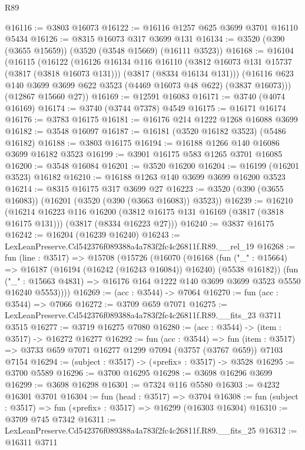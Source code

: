\begin{lexlean}{R89}
\begin{coremodule}
@16116 := @3803 @16073
@16122 := @16116 @1257 @625 @3699 @3701 @16110 @5434
@16126 := @8315 @16073 @317 @3699 @131
@16134 := @3520 (@390 (@3655 @15659)) (@3520 (@3548 @15669) (@16111 @3523))
@16168 := @16104
    (@16115
      (@16122
        (@16126
          @16134
          @116
          @16110
          (@3812 @16073 @131 @15737 (@3817 (@3818 @16073 @131)))
          (@3817 (@8334 @16134 @131)))
        (@16116 @623 @140 @3699 @3699 @622 @3523 (@4469 @16073 @48 @622) (@3837 @16073)))
      (@12867 @15660 @27))
@16169 := @12591 @16083
@16171 := @3740 (@4074 @16169)
@16174 := @3740 (@3744 @7378) @4549
@16175 := @16171 @16174
@16176 := @3783 @16175
@16181 := @16176 @214 @1222 @1268 @16088 @3699
@16182 := @3548 @16097
@16187 := @16181 (@3520 @16182 @3523) (@5486 @16182)
@16188 := @3803 @16175
@16194 := @16188 @1266 @140 @16086 @3699 @16182 @3523
@16199 := @3901 @16175 @583 @1265 @3701 @16085
@16200 := @3548 @16084
@16201 := @3520 @16200
@16204 := @16199 (@16201 @3523) @16182
@16210 := @16188 @1263 @140 @3699 @3699 @16200 @3523
@16214 := @8315 @16175 @317 @3699 @27
@16223 := @3520 (@390 (@3655 @16083)) (@16201 (@3520 (@390 (@3663 @16083)) @3523))
@16239 := @16210
    (@16214
      @16223
      @116
      @16200
      (@3812 @16175 @131 @16169 (@3817 (@3818 @16175 @131)))
      (@3817 (@8334 @16223 @27)))
@16240 := @3837 @16175
@16242 := @16204 (@16239 @16240)
@16243 := LexLeanPreserve.Cd542376f089388a4a783f2fc4c26811f.R89.__rel_19
@16268 := fun (line : @3517) =>
  @15708
    (@15726
      (@16070
        (@16168
          (fun ("_" : @15664) => @16187 (@16194 (@16242 (@16243 @16084)) @16240) (@5538 @16182))
          (fun ("_" : @15663 @4831) =>
          @16176 @164 @1222 @140 @3699 @3699 @3523 @5550 @16240 @5553))))
@16269 := (acc : @3544) -> @7064
@16270 := fun (acc : @3544) => @7066
@16272 := @3709 @659 @7071
@16275 := LexLeanPreserve.Cd542376f089388a4a783f2fc4c26811f.R89.__fits_23 @3711 @3515
@16277 := @3719 @16275 @7080
@16280 := (acc : @3544) -> (item : @3517) -> @16272 @16277
@16292 := fun (acc : @3544) =>
  fun (item : @3517) => @3733 @659 @7071 @16277 @1299 @7094 (@3757 (@3767 @659)) @7103 @7154
@16294 := (subject : @3517) -> («prefix» : @3517) -> @3528
@16295 := @3700 @5589
@16296 := @3700 @16295
@16298 := @3698 @16296 @3699
@16299 := @3698 @16298
@16301 := @7324 @116 @5580
@16303 := @4232 @16301 @3701
@16304 := fun (head : @3517) => @3704
@16308 := fun (subject : @3517) => fun («prefix» : @3517) => @16299 (@16303 @16304)
@16310 := @3709 @745 @7342
@16311 := LexLeanPreserve.Cd542376f089388a4a783f2fc4c26811f.R89.__fits_25
@16312 := @16311 @3711

\end{coremodule}
\end{lexlean}
